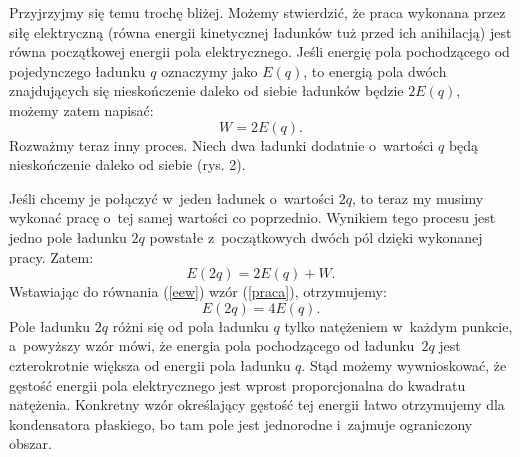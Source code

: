 Przyjrzyjmy się temu trochę bliżej. Możemy stwierdzić, że praca wykonana przez siłę elektryczną (równa energii kinetycznej ładunków tuż przed ich anihilacją) jest równa początkowej energii pola elektrycznego. Jeśli energię pola pochodzącego od pojedynczego ładunku $q$ oznaczymy jako $E(q)$, to energią pola dwóch znajdujących się nieskończenie daleko od siebie ładunków będzie $2E(q)$, możemy zatem napisać:
\begin{equation}\label{praca}
  W=2E(q).
\end{equation}
Rozważmy teraz inny proces. Niech dwa ładunki dodatnie o~wartości $q$ będą nieskończenie daleko od siebie (rys. 2).


Jeśli chcemy je połączyć w~jeden ładunek o~wartości $2q$, to teraz my musimy wykonać pracę o~tej samej wartości co poprzednio. Wynikiem tego procesu jest jedno pole ładunku $2q$ powstałe z~początkowych dwóch pól dzięki wykonanej pracy. Zatem:
\begin{equation}\label{eew}
  E(2q)=2E(q)+W.
\end{equation}
Wstawiając do równania (\ref{eew}) wzór (\ref{praca}), otrzymujemy:
$$
E(2q)=4E(q).
$$
Pole ładunku $2q$ różni się od pola ładunku $q$ tylko natężeniem w~każdym punkcie, a~powyższy wzór mówi, że energia pola pochodzącego od ładunku~$2q$ jest czterokrotnie większa od energii pola ładunku $q$. Stąd możemy wywnioskować, że gęstość energii pola elektrycznego jest wprost proporcjonalna do kwadratu natężenia. Konkretny wzór określający gęstość tej energii łatwo otrzymujemy dla kondensatora płaskiego, bo tam pole jest jednorodne i~zajmuje ograniczony obszar.

